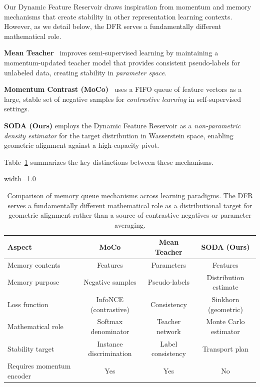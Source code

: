 Our Dynamic Feature Reservoir draws inspiration from momentum and memory mechanisms that create stability in other representation learning contexts. However, as we detail below, the DFR serves a fundamentally different mathematical role.

\textbf{Mean Teacher}~\citep{tarvainen2017mean} improves semi-supervised learning by maintaining a momentum-updated teacher model that provides consistent pseudo-labels for unlabeled data, creating stability in \textit{parameter space}.

\textbf{Momentum Contrast (MoCo)}~\citep{he2020momentum} uses a FIFO queue of feature vectors as a large, stable set of negative samples for \textit{contrastive learning} in self-supervised settings.
\begin{sloppypar} 
\textbf{SODA (Ours)} employs the Dynamic Feature Reservoir as a \textit{non-parametric density estimator} for the target distribution in Wasserstein space, enabling geometric alignment against a high-capacity pivot.
\end{sloppypar} 
Table~\ref{tab:queue_comparison} summarizes the key distinctions between these mechanisms.

\begin{table}[t]
\caption{Comparison of memory queue mechanisms across learning paradigms. The DFR serves a fundamentally different mathematical role as a distributional target for geometric alignment rather than a source of contrastive negatives or parameter averaging.}
\begin{adjustbox}{width=1.0\textwidth}

\label{tab:queue_comparison}
\centering
\small
\begin{tabular}{lccc}
\toprule
\textbf{Aspect} & \textbf{MoCo} & \textbf{Mean Teacher} & \textbf{SODA (Ours)} \\
\midrule
Memory contents & Features & Parameters & Features \\
Memory purpose & Negative samples & Pseudo-labels & Distribution estimate \\
Loss function & InfoNCE (contrastive) & Consistency & Sinkhorn (geometric) \\
Mathematical role & Softmax denominator & Teacher network & Monte Carlo estimator \\
Stability target & Instance discrimination & Label consistency & Transport plan \\
Requires momentum encoder & Yes & Yes & No \\
\bottomrule
\end{tabular}
\end{adjustbox}
\end{table}

